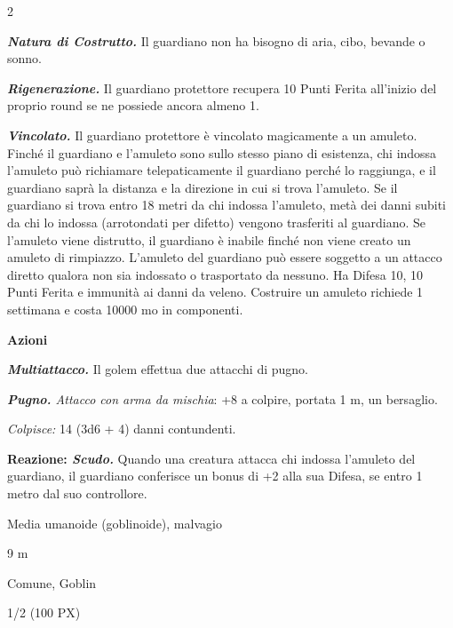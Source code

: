 \begin{multicols}{2}
{\emph{\textbf{Natura di Costrutto.}} Il guardiano non ha bisogno di aria, cibo, bevande o sonno.

\emph{\textbf{Rigenerazione.}} Il guardiano protettore recupera 10 Punti Ferita all'inizio del proprio round se ne possiede ancora almeno 1.

\emph{\textbf{Vincolato.}} Il guardiano protettore è vincolato magicamente a un amuleto. Finché il guardiano e l'amuleto sono sullo stesso piano di esistenza, chi indossa l'amuleto può richiamare telepaticamente il guardiano perché lo raggiunga, e il guardiano saprà la distanza e la direzione in cui si trova l'amuleto. Se il guardiano si trova entro 18 metri da chi indossa l'amuleto, metà dei danni subiti da chi lo indossa (arrotondati per difetto) vengono trasferiti al guardiano. Se l'amuleto viene distrutto, il guardiano è inabile finché non viene creato un amuleto di rimpiazzo. L'amuleto del guardiano può essere soggetto a un attacco diretto qualora non sia indossato o trasportato da nessuno. Ha Difesa 10, 10 Punti Ferita e immunità ai danni da veleno. Costruire un amuleto richiede 1 settimana e costa 10000 mo in componenti.

\textbf{Azioni}

\emph{\textbf{Multiattacco.}} Il golem effettua due attacchi di pugno.

\emph{\textbf{Pugno.} Attacco con arma da mischia}: +8 a colpire, portata 1 m, un bersaglio.

\emph{Colpisce:} 14 (3d6 + 4) danni contundenti.

\textbf{Reazione: \emph{Scudo.}} Quando una creatura attacca chi indossa l'amuleto del guardiano, il guardiano conferisce un bonus di +2 alla sua Difesa, se entro 1 metro dal suo controllore.


\begin{description}[noitemsep, topsep=0pt, parsep=0pt, partopsep=0pt, itemsep=1pt, leftmargin=2.35cm,  labelwidth=2.2cm, itemindent=0cm, listparindent=0pt] %
\setlength{\baselineskip}{10pt}
\item[\textbf{Taglia/Tipo}] Media umanoide (goblinoide), malvagio
\item[\textbf{Caratt.}] 
\item[\textbf{Punti Ferita}] 
\item[\textbf{Movimento}] 9 m
\item[\textbf{Tiri Salvez.}] 
\item[\textbf{Sensi}] 
\item[\textbf{Linguaggi}] Comune, Goblin
\item[\textbf{Sfida}] 1/2 (100 PX)
\end{description}
\smallskip

}
\end{multicols}
